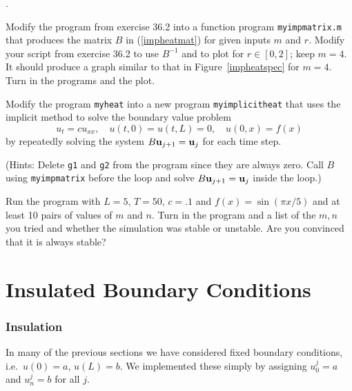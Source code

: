 \begin{list}
{.}{}

\item
Modify the program  from exercise 36.2 into a
function program \verb&myimpmatrix.m& that produces the matrix $B$ 
in (\ref{impheatmat})
for given inputs $m$ and $r$. Modify your script from exercise
36.2 to use $B^{-1}$ and to plot for \(r\in[0,2]\); keep $m = 4$. It should produce a
graph similar to that in Figure~\ref{impheatspec} for $m = 4$. Turn in the
programs and the plot.

\item
Modify the program \verb&myheat& into a new program \verb&myimplicitheat&
that uses the implicit method to solve the boundary value problem
$$
    u_t = c u_{xx}, \quad u(t,0) = u(t,L) = 0, \quad u(0,x) = f(x)
$$
by repeatedly solving the system $B \mathbf{u}_{j+1} = \mathbf{u}_j$ for each time step.

(Hints: Delete \verb&g1& and \verb&g2& from the program
since they are always zero. Call $B$ using \verb&myimpmatrix& before the
loop and solve $B \mathbf{u}_{j+1} = \mathbf{u}_j$ inside the loop.)

Run the program with $L=5$, $T=50$, $c=.1$ and $f(x) = \sin( \pi x/5)$ and at least 10 pairs
of values of $m$ and $n$. Turn in the program and a list of the $m,n$ you tried
and whether the simulation was stable or unstable. Are you convinced that it is 
always stable?


    


\end{list}




\chapter{Insulated Boundary Conditions}


\subsection*{Insulation}

In many of the previous sections we have considered fixed boundary
conditions, i.e.~$u(0) = a$, $u(L) = b$.  We implemented these simply
by assigning $u_0^j =a$ and $u_n^j = b$ for all $j$.

